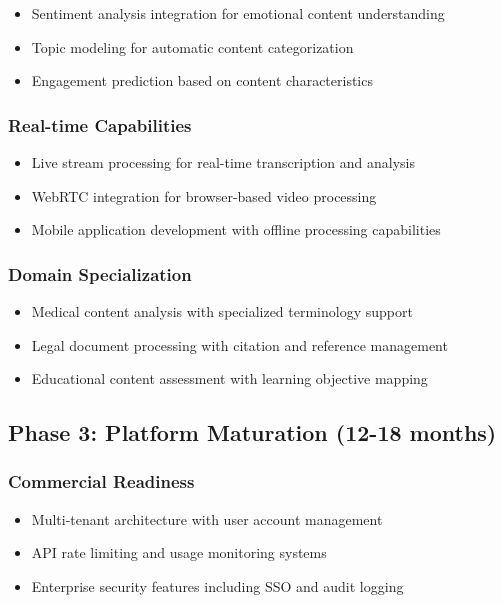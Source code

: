 \documentclass{bscs}
\begin{document}
\begin{itemize}
\item Sentiment analysis integration for emotional content understanding
\item Topic modeling for automatic content categorization
\item Engagement prediction based on content characteristics
\end{itemize}

\subsubsection{Real-time Capabilities}

\begin{itemize}
\item Live stream processing for real-time transcription and analysis
\item WebRTC integration for browser-based video processing
\item Mobile application development with offline processing capabilities
\end{itemize}

\subsubsection{Domain Specialization}

\begin{itemize}
\item Medical content analysis with specialized terminology support
\item Legal document processing with citation and reference management
\item Educational content assessment with learning objective mapping
\end{itemize}

\subsection{Phase 3: Platform Maturation (12-18 months)}

\subsubsection{Commercial Readiness}

\begin{itemize}
\item Multi-tenant architecture with user account management
\item API rate limiting and usage monitoring systems
\item Enterprise security features including SSO and audit logging
\end{itemize}
\end{document}
